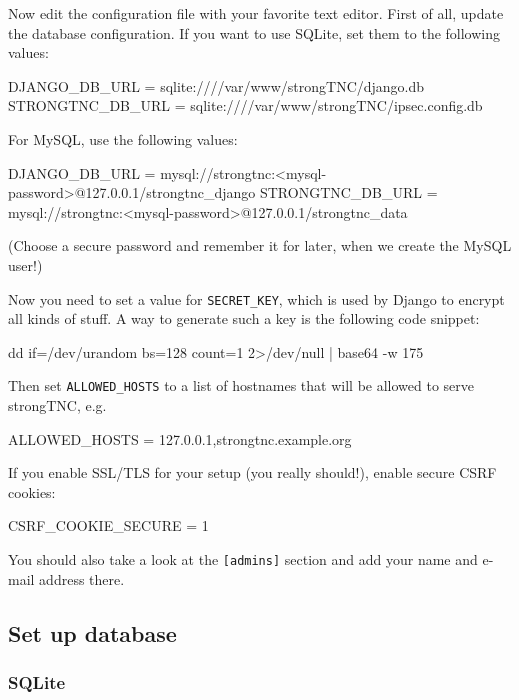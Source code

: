 Now edit the configuration file with your favorite text editor. First of all,
update the database configuration. If you want to use SQLite, set them to the
following values:

\begin{bashcode}
DJANGO_DB_URL = sqlite:////var/www/strongTNC/django.db
STRONGTNC_DB_URL = sqlite:////var/www/strongTNC/ipsec.config.db
\end{bashcode}

For MySQL, use the following values:

\begin{bashcode}
DJANGO_DB_URL = mysql://strongtnc:<mysql-password>@127.0.0.1/strongtnc_django
STRONGTNC_DB_URL = mysql://strongtnc:<mysql-password>@127.0.0.1/strongtnc_data
\end{bashcode}

(Choose a secure password and remember it for later, when we create the MySQL
user!)

Now you need to set a value for \texttt{SECRET\_KEY}, which is used by Django to
encrypt all kinds of stuff. A way to generate such a key is the following code
snippet:

\begin{bashcode}
dd if=/dev/urandom bs=128 count=1 2>/dev/null | base64 -w 175
\end{bashcode}

Then set \texttt{ALLOWED\_HOSTS} to a list of hostnames that will be allowed to
serve strongTNC, e.g.

\begin{bashcode}
ALLOWED_HOSTS = 127.0.0.1,strongtnc.example.org
\end{bashcode}

If you enable SSL/TLS for your setup (you really should!), enable secure CSRF
cookies:

\begin{bashcode}
CSRF_COOKIE_SECURE = 1
\end{bashcode}

You should also take a look at the \texttt{[admins]} section and add your name
and e-mail address there.

\subsection*{Set up database}

\subsubsection*{SQLite}

